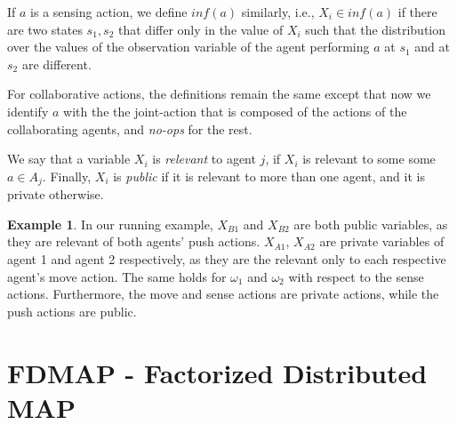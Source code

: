 \documentclass[letterpaper]{article} %
\theoremstyle{definition}
\newtheorem{example}{Example}
\newcommand{\commentout}[1]{}
\newcommand{\eliran}[1]{\textbf{[\color{red}ELIRAN:#1]}}
\newcommand{\ronen}[1]{\textbf{[\color{blue}RONEN:#1]}}
\begin{document}
If $a$ is a sensing action, we define $inf(a)$ similarly, i.e.,
$X_i\in inf(a)$ if there are two states $s_1,s_2$ that differ only in the value of $X_i$ such that the distribution over the values of the observation variable of the agent performing $a$ at $s_1$ and at $s_2$ are different.


For collaborative actions, the definitions remain the same except that now we identify $a$ with the the joint-action that is composed of the actions of the collaborating agents, and {\em no-ops} for the rest.

We say that a variable $X_i$ is \emph{relevant} to agent $j$, if  $X_i$ is relevant to some some $a\in A_j$.
Finally, $X_i$ is \emph{public} if it is relevant to more than one agent, and it is private otherwise.

\begin{example}
In our running example, $X_{B1}$ and $X_{B2}$ are both public variables, as they are relevant of both agents' push actions.
$X_{A1}$, $X_{A2}$ are private variables of agent 1 and agent 2 respectively, as they are the relevant only to each respective agent's move action. The same holds for $\omega_1$ and $\omega_2$ with respect to the sense actions.
Furthermore, the move and sense actions are private actions, while the push actions are public.
\end{example}



\section{FDMAP - Factorized Distributed MAP}
\commentout{
We produce policy policy graphs for the agents in three steps. First, we generate a team solution using a POMDP for the centralized problem. Next, we generate single agent POMDPs in which each agent attempts to fulfill its part in the team solution. Finally, the policies obtained from the single agent POMDPs are synchronized. 

Given the input factored Dec-POMDP problem $P$, we first generate the team POMDP $P_{team}$. $P_{team}$ is identical to $P$, ignoring the underlying multi-agent structure. That is, the actions are the joint actions and the observations are the joint observation, viewed as applied 
and observed by a single agent. Equivalently, this can be viewed as a Dec-POMDP in which all observations are communicated accurately and instantaneously to all agents.}
\end{document}
